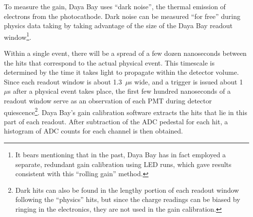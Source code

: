\documentclass[../thesis.tex]{subfiles}
\begin{document}
To measure the gain, Daya Bay uses ``dark noise'', the thermal emission of electrons from the photocathode. Dark noise can be measured ``for free'' during physics data taking by taking advantage of the size of the Daya Bay readout window\footnote{It bears mentioning that in the past, Daya Bay has in fact employed a separate, redundant gain calibration using LED runs, which gave results consistent with this ``rolling gain'' method.}.
\begin{comment}
  \footnote{(WRONG) Each dynode can of course also emit electrons, but the collected charge is attenuated by $\mathcal{O}(5^n)$ for emission from the $n$th dynode. This effect can therefore be safely neglected for our purposes. NOTE: This can't be the reason. A 1/5-scale effect is certainly relevant if dynode thermal emission happens often enough. I believe the actual reason for only considering photocathode emission is that it's the only material that emits electrons at a significant rate (thanks to its work function?).}
\end{comment}
Within a single event, there will be a spread of a few dozen nanoseconds between the hits that correspond to the actual physical event. This timescale is determined by the time it takes light to propagate within the detector volume. Since each readout window is about 1.3~$\mu$s wide, and a trigger is issued about 1~$\mu$s after a physical event takes place, the first few hundred nanoseconds of a readout window serve as an observation of each PMT during detector quiescence\footnote{Dark hits can also be found in the lengthy portion of each readout window following the ``physics'' hits, but since the charge readings can be biased by ringing in the electronics, they are not used in the gain calibration.}. Daya Bay's gain calibration software extracts the hits that lie in this part of each readout. After subtraction of the ADC pedestal for each hit, a histogram of ADC counts for each channel is then obtained.
\end{document}
